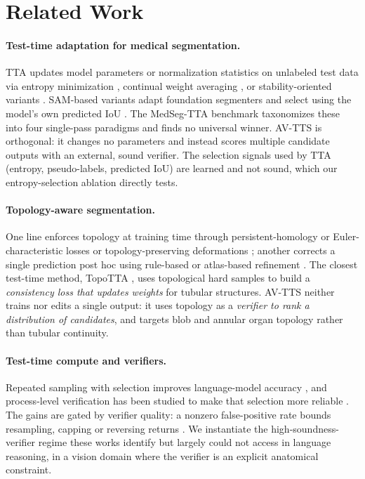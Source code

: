 \documentclass[10pt]{article}
\begin{document}
\section{Related Work}\label{sec:related}
\paragraph{Test-time adaptation for medical segmentation.} TTA updates model parameters or normalization statistics on unlabeled test data via entropy minimization \citep{wang2021tent}, continual weight averaging \citep{wang2022cotta}, or stability-oriented variants \citep{niu2023sar}. SAM-based variants adapt foundation segmenters and select using the model's own predicted IoU \citep{samtta2026}. The MedSeg-TTA benchmark \citep{yu2025medsegtta} taxonomizes these into four single-pass paradigms and finds no universal winner. AV-TTS is orthogonal: it changes no parameters and instead scores multiple candidate outputs with an external, sound verifier. The selection signals used by TTA (entropy, pseudo-labels, predicted IoU) are learned and not sound, which our entropy-selection ablation directly tests.

\paragraph{Topology-aware segmentation.} One line enforces topology at training time through persistent-homology or Euler-characteristic losses \citep{phloss2021,eulerchar2025} or topology-preserving deformations \citep{tedsnet2022}; another corrects a single prediction post hoc using rule-based or atlas-based refinement \citep{atlasistn2021}. The closest test-time method, TopoTTA \citep{zhou2025topotta}, uses topological hard samples to build a \emph{consistency loss that updates weights} for tubular structures. AV-TTS neither trains nor edits a single output: it uses topology as a \emph{verifier to rank a distribution of candidates}, and targets blob and annular organ topology rather than tubular continuity.

\paragraph{Test-time compute and verifiers.} Repeated sampling with selection improves language-model accuracy \citep{snell2024scaling,brown2024monkeys,wang2023self}, and process-level verification has been studied to make that selection more reliable \citep{lightman2024verify}. The gains are gated by verifier quality: a nonzero false-positive rate bounds resampling, capping or reversing returns \citep{stroebl2024verifier,setlur2025verifier}. We instantiate the high-soundness-verifier regime these works identify but largely could not access in language reasoning, in a vision domain where the verifier is an explicit anatomical constraint.
\end{document}
